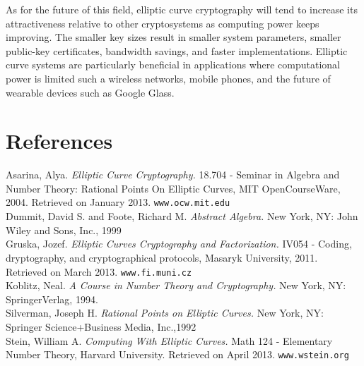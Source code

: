 \documentclass[12pt]{article}
\begin{document}
As for the future of this field, elliptic curve cryptography will tend to increase its attractiveness relative to other cryptosystems as computing power keeps improving. The smaller key sizes result in smaller system parameters, smaller public-key certificates, bandwidth savings, and faster implementations. Elliptic curve systems are particularly beneficial in applications where computational power is limited such a wireless networks, mobile phones, and the future of wearable devices such as Google Glass.  \\


\newpage


\section*{References}

\noindent [As] Asarina, Alya. \emph{Elliptic Curve Cryptography.} 18.704 -  Seminar in Algebra and Number Theory: Rational Points On Elliptic Curves, MIT OpenCourseWare, 2004.  Retrieved on January 2013. {\tt www.ocw.mit.edu}\\

\noindent [Du] Dummit, David S. and Foote, Richard M. \emph{Abstract Algebra.} New York, NY: John Wiley and Sons, Inc., 1999 \\

\noindent [Gru] Gruska, Jozef. \emph{Elliptic Curves Cryptography and Factorization.} IV054 - Coding, dryptography, and cryptographical protocols, Masaryk University, 2011. Retrieved on March 2013. {\tt www.fi.muni.cz} \\

\noindent [Ko] Koblitz, Neal. \emph{A Course in Number Theory and Cryptography.} New York, NY: SpringerVerlag, 1994. \\

\noindent [Si] Silverman, Joseph H.  \emph{Rational Points on Elliptic Curves.} New York, NY: Springer Science+Business Media, Inc.,1992 \\

\noindent [Ste] Stein, William A. \emph{Computing With Elliptic Curves.} Math 124 - Elementary Number Theory, Harvard University. Retrieved on April 2013. {\tt www.wstein.org}
\end{document}

